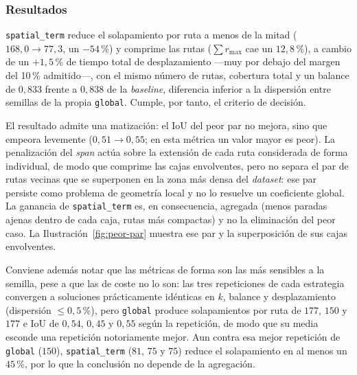 \subsubsection*{Resultados}

\texttt{spatial\_term} reduce el solapamiento por ruta a menos de la mitad
($168{,}0 \rightarrow 77{,}3$, un $-54$\,\%) y comprime las rutas
($\sum r_{\max}$ cae un $12{,}8$\,\%), a cambio de un $+1{,}5$\,\% de tiempo
total de desplazamiento ---muy por debajo del margen del 10\,\% admitido---, con
el mismo número de rutas, cobertura total y un balance de $0{,}833$ frente a
$0{,}838$ de la \textit{baseline}, diferencia inferior a la dispersión entre
semillas de la propia \texttt{global}. Cumple, por tanto, el criterio de
decisión.

El resultado admite una matización: el IoU del peor par
no mejora, sino que empeora levemente ($0{,}51 \rightarrow 0{,}55$; en
esta métrica un valor mayor es peor). La penalización del \textit{span} actúa
sobre la extensión de cada ruta considerada de forma individual, de modo que
comprime las cajas envolventes, pero no separa el par de rutas vecinas que se
superponen en la zona más densa del \textit{dataset}: ese par persiste como
problema de geometría local y no lo resuelve un coeficiente global. La ganancia
de \texttt{spatial\_term} es, en consecuencia, agregada (menos paradas ajenas
dentro de cada caja, rutas más compactas) y no la eliminación del peor caso.
La Ilustración~\ref{fig:peor-par} muestra ese par y la superposición de sus
cajas envolventes.

Conviene además notar que las métricas de forma son las más sensibles a la
semilla, pese a que las de coste no lo son: las tres repeticiones de cada
estrategia convergen a soluciones prácticamente idénticas en $k$, balance y
desplazamiento (dispersión $\leq 0{,}5$\,\%), pero \texttt{global} produce
solapamientos por ruta de $177$, $150$ y $177$ e IoU de $0{,}54$, $0{,}45$ y
$0{,}55$ según la repetición, de modo que su media esconde una repetición
notoriamente mejor. Aun contra esa mejor repetición de \texttt{global} ($150$),
\texttt{spatial\_term} ($81$, $75$ y $75$) reduce el solapamiento en al menos un
$45$\,\%, por lo que la conclusión no depende de la agregación.

